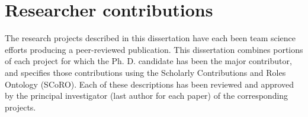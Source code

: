 \section{Researcher contributions}

The research projects described in this dissertation have each been team science efforts producing a peer-reviewed publication. This dissertation combines portions of each project for which the Ph. D. candidate has been the major contributor, and specifies those contributions using the Scholarly Contributions and Roles Ontology (SCoRO)\cite{Shotton2020-ph}. Each of these descriptions has been reviewed and approved by the principal investigator (last author for each paper) of the corresponding projects. 